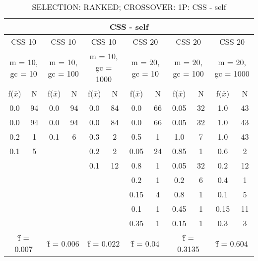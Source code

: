 \begin{table}[H]
	\centering
	\caption{SELECTION: RANKED; CROSSOVER: 1P: CSS - self}
	\begin{adjustbox}{width=1\textwidth}
		\begin{tabular}{ |c|c||c|c||c|c||c|c||c|c||c|c| }
			\hline
			\multicolumn{12}{|c|}{CSS - self} \\
			\hline
			\multicolumn{2}{|c||}{CSS-10} & \multicolumn{2}{c||}{CSS-10} & \multicolumn{2}{c||}{CSS-10} & \multicolumn{2}{c||}{CSS-20} & \multicolumn{2}{c||}{CSS-20} & \multicolumn{2}{c|}{CSS-20}\\
			\hline
			\multicolumn{2}{|c||}{m = 10, gc = 10} & \multicolumn{2}{c||}{m = 10, gc = 100} & \multicolumn{2}{c||}{m = 10, gc = 1000} & \multicolumn{2}{c||}{m = 20, gc = 10} & \multicolumn{2}{c||}{m = 20, gc = 100} & \multicolumn{2}{c|}{m = 20, gc = 1000}\\
			\hline
			f($\bar{x}$) & N & f($\bar{x}$) & N & f($\bar{x}$) & N & f($\bar{x}$) & N & f($\bar{x}$) & N & f($\bar{x}$) & N\\
			\hline
			\hline
			0.0 & 94 & 0.0 & 94 & 0.0 & 84 & 0.0 & 66 & 0.05 & 32 & 1.0 & 43\\
			\hline
			0.0 & 94 & 0.0 & 94 & 0.0 & 84 & 0.0 & 66 & 0.05 & 32 & 1.0 & 43\\
			0.2 & 1 & 0.1 & 6 & 0.3 & 2 & 0.5 & 1 & 1.0 & 7 & 1.0 & 43\\
			0.1 & 5 &   &   & 0.2 & 2 & 0.05 & 24 & 0.85 & 1 & 0.6 & 2\\
			&   &   &   & 0.1 & 12 & 0.8 & 1 & 0.05 & 32 & 0.2 & 12\\
			&   &   &   &   &   & 0.2 & 1 & 0.2 & 6 & 0.4 & 1\\
			&   &   &   &   &   & 0.15 & 4 & 0.8 & 1 & 0.1 & 5\\
			&   &   &   &   &   & 0.1 & 1 & 0.45 & 1 & 0.15 & 11\\
			&   &   &   &   &   & 0.35 & 1 & 0.15 & 1 & 0.3 & 3\\
			\hline
			\multicolumn{2}{|c||}{\^{f} = 0.007} & \multicolumn{2}{c||}{\^{f} = 0.006} & \multicolumn{2}{c||}{\^{f} = 0.022} & \multicolumn{2}{c||}{\^{f} = 0.04} & \multicolumn{2}{c||}{\^{f} = 0.3135} & \multicolumn{2}{c|}{\^{f} = 0.604}\\
			\hline
		\end{tabular}
	\end{adjustbox}
\end{table}
